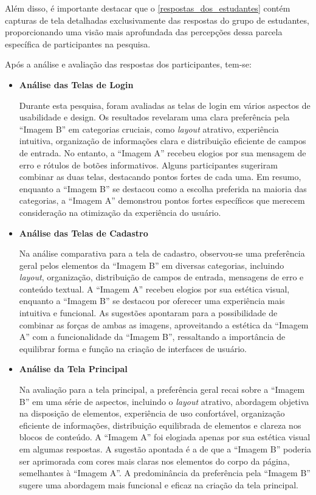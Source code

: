 Além disso, é importante destacar que o \autoref{respostas_dos_estudantes} contém capturas de tela detalhadas exclusivamente das respostas do grupo de estudantes, proporcionando uma visão mais aprofundada das percepções dessa parcela específica de participantes na pesquisa.

Após a análise e avaliação das respostas dos participantes, tem-se: 


\begin{itemize}
    \item \textbf{Análise das Telas de Login}
    
    Durante esta pesquisa, foram avaliadas as telas de login em vários aspectos de usabilidade e design. Os resultados revelaram uma clara preferência pela ``Imagem B'' em categorias cruciais, como \textit{layout} atrativo, experiência intuitiva, organização de informações clara e distribuição eficiente de campos de entrada. No entanto, a ``Imagem A'' recebeu elogios por sua mensagem de erro e rótulos de botões informativos. Alguns participantes sugeriram combinar as duas telas, destacando pontos fortes de cada uma. Em resumo, enquanto a ``Imagem B'' se destacou como a escolha preferida na maioria das categorias, a ``Imagem A'' demonstrou pontos fortes específicos que merecem consideração na otimização da experiência do usuário.
    
    \item \textbf{Análise das Telas de Cadastro}
    
    Na análise comparativa para a tela de cadastro, observou-se uma preferência geral pelos elementos da ``Imagem B'' em diversas categorias, incluindo \textit{layout}, organização, distribuição de campos de entrada, mensagens de erro e conteúdo textual. A ``Imagem A'' recebeu elogios por sua estética visual, enquanto a ``Imagem B'' se destacou por oferecer uma experiência mais intuitiva e funcional. As sugestões apontaram para a possibilidade de combinar as forças de ambas as imagens, aproveitando a estética da ``Imagem A'' com a funcionalidade da ``Imagem B'', ressaltando a importância de equilibrar forma e função na criação de interfaces de usuário.
    
    \item \textbf{Análise da Tela Principal}
    
    Na avaliação para a tela principal, a preferência geral recai sobre a ``Imagem B'' em uma série de aspectos, incluindo o \textit{layout} atrativo, abordagem objetiva na disposição de elementos, experiência de uso confortável, organização eficiente de informações, distribuição equilibrada de elementos e clareza nos blocos de conteúdo. A ``Imagem A'' foi elogiada apenas por sua estética visual em algumas respostas. A sugestão apontada é a de que a ``Imagem B'' poderia ser aprimorada com cores mais claras nos elementos do corpo da página, semelhantes à ``Imagem A''. A predominância da preferência pela ``Imagem B'' sugere uma abordagem mais funcional e eficaz na criação da tela principal.
    

\end{itemize}
